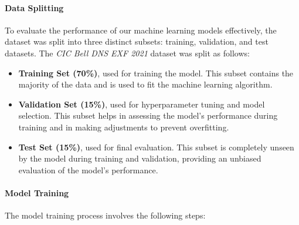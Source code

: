 \paragraph{Data Splitting}

To evaluate the performance of our machine learning models effectively, the dataset was split into three distinct subsets: training, validation, and test datasets. The \textit{CIC Bell DNS EXF 2021} dataset was split as follows:
\begin{itemize}
    \item \textbf{Training Set (70\%)}, used for training the model. This subset contains the majority of the data and is used to fit the machine learning algorithm.
    \item \textbf{Validation Set (15\%)}, used for hyperparameter tuning and model selection. This subset helps in assessing the model’s performance during training and in making adjustments to prevent overfitting.
    \item \textbf{Test Set (15\%)}, used for final evaluation. This subset is completely unseen by the model during training and validation, providing an unbiased evaluation of the model’s performance.
\end{itemize}

\paragraph{Model Training}

The model training process involves the following steps:

